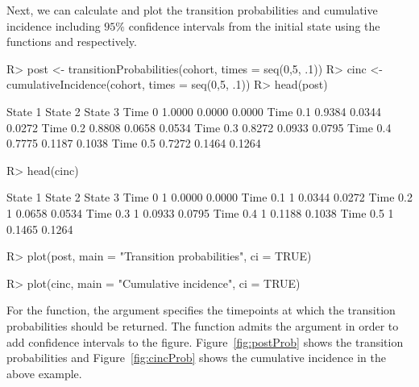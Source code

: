 Next, we can calculate and plot the transition probabilities and cumulative incidence including $95\%$ confidence intervals from the initial state using the functions  and  respectively.
\begin{Schunk}
\begin{Sinput}
R>   post <- transitionProbabilities(cohort, times = seq(0,5, .1))
R>   cinc <- cumulativeIncidence(cohort, times = seq(0,5, .1))
R>   head(post)
\end{Sinput}
\begin{Soutput}
         State 1 State 2 State 3
Time 0    1.0000  0.0000  0.0000
Time 0.1  0.9384  0.0344  0.0272
Time 0.2  0.8808  0.0658  0.0534
Time 0.3  0.8272  0.0933  0.0795
Time 0.4  0.7775  0.1187  0.1038
Time 0.5  0.7272  0.1464  0.1264
\end{Soutput}
\begin{Sinput}
R>   head(cinc)
\end{Sinput}
\begin{Soutput}
         State 1 State 2 State 3
Time 0         1  0.0000  0.0000
Time 0.1       1  0.0344  0.0272
Time 0.2       1  0.0658  0.0534
Time 0.3       1  0.0933  0.0795
Time 0.4       1  0.1188  0.1038
Time 0.5       1  0.1465  0.1264
\end{Soutput}
\end{Schunk}
\begin{Schunk}
\begin{Sinput}
R>   plot(post, main = "Transition probabilities", ci = TRUE)
\end{Sinput}
\end{Schunk}
\begin{Schunk}
\begin{Sinput}
R>   plot(cinc, main = "Cumulative incidence", ci = TRUE)
\end{Sinput}
\end{Schunk}

For the  function, the argument  specifies the timepoints at which the transition probabilities should be returned. The  function admits the argument  in order to add confidence intervals to the figure. Figure~\ref{fig:postProb} shows the transition probabilities and Figure~\ref{fig:cincProb} shows the cumulative incidence in the above example. 

